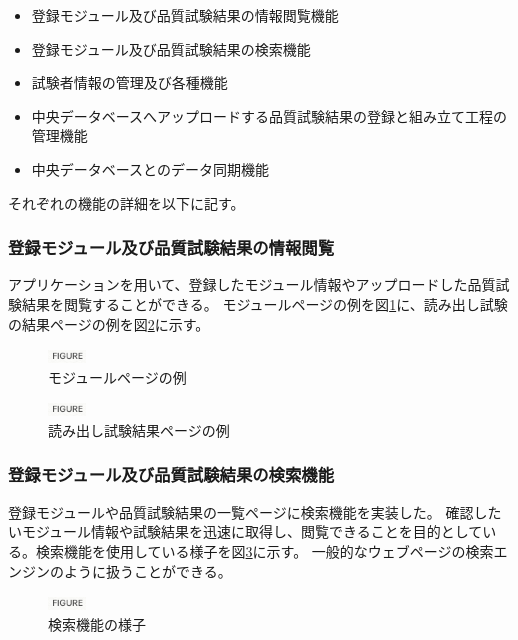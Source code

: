 \begin{itemize}
  \item 登録モジュール及び品質試験結果の情報閲覧機能
  \item 登録モジュール及び品質試験結果の検索機能
  \item 試験者情報の管理及び各種機能
  \item 中央データベースへアップロードする品質試験結果の登録と組み立て工程の管理機能
  \item 中央データベースとのデータ同期機能
\end{itemize}

それぞれの機能の詳細を以下に記す。

\subsubsection{登録モジュール及び品質試験結果の情報閲覧}
アプリケーションを用いて、登録したモジュール情報やアップロードした品質試験結果を閲覧することができる。
モジュールページの例を図\ref{webapp_modulepage}に、読み出し試験の結果ページの例を図\ref{webapp_scanpage}に示す。

\begin{figure}[bpt]\centering
\includegraphics[width=1cm]{figure}
\caption[モジュールページの例]{モジュールページの例}
\label{webapp_modulepage}
\end{figure}

\begin{figure}[bpt]\centering
\includegraphics[width=1cm]{figure}
\caption[読み出し試験結果ページの例]{読み出し試験結果ページの例}
\label{webapp_scanpage}
\end{figure}

\subsubsection{登録モジュール及び品質試験結果の検索機能}
登録モジュールや品質試験結果の一覧ページに検索機能を実装した。
確認したいモジュール情報や試験結果を迅速に取得し、閲覧できることを目的としている。検索機能を使用している様子を図\ref{webapp_search_function}に示す。
一般的なウェブページの検索エンジンのように扱うことができる。

\begin{figure}[bpt]\centering
\includegraphics[width=1cm]{figure}
\caption[検索機能の様子]{検索機能の様子}
\label{webapp_search_function}
\end{figure}

